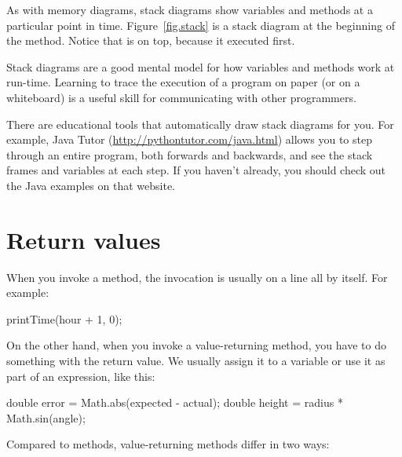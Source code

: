 As with memory diagrams, stack diagrams show variables and methods at a particular point in time.
Figure~\ref{fig.stack} is a stack diagram at the beginning of the  method.
Notice that  is on top, because it executed first.




Stack diagrams are a good mental model for how variables and methods work at run-time.
Learning to trace the execution of a program on paper (or on a whiteboard) is a useful skill for communicating with other programmers.

There are educational tools that automatically draw stack diagrams for you.
For example, Java Tutor (\url{http://pythontutor.com/java.html}) allows you to step through an entire program, both forwards and backwards, and see the stack frames and variables at each step.
If you haven't already, you should check out the Java examples on that website.



\section{Return values}


When you invoke a  method, the invocation is usually on a line all by itself.
For example:

\begin{code}
printTime(hour + 1, 0);
\end{code}

On the other hand, when you invoke a value-returning method, you have to do something with the return value.
We usually assign it to a variable or use it as part of an expression, like this:

\begin{code}
double error = Math.abs(expected - actual);
double height = radius * Math.sin(angle);
\end{code}


Compared to  methods, value-returning methods differ in two ways:

